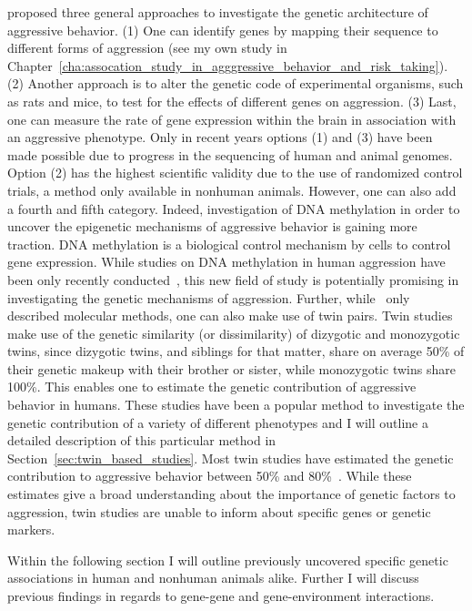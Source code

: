 \citet{Maxson2005} proposed three general approaches to investigate the genetic architecture of aggressive behavior.
(1) One can identify genes by mapping their sequence to different forms of aggression (see my own study in Chapter~\ref{cha:assocation_study_in_agggressive_behavior_and_risk_taking}).
(2) Another approach is to alter the genetic code of experimental organisms, such as rats and mice, to test for the effects of different genes on aggression.
(3) Last, one can measure the rate of gene expression within the brain in association with an aggressive phenotype.
Only in recent years options (1) and (3) have been made possible due to progress in the sequencing of human and animal genomes.
Option (2) has the highest scientific validity due to the use of randomized control trials, a method only available in nonhuman animals.
However, one can also add a fourth and fifth category.
Indeed, investigation of DNA methylation in order to uncover the epigenetic mechanisms of aggressive behavior is gaining more traction.
DNA methylation is a biological control mechanism by cells to control gene expression.
While studies on DNA methylation in human aggression have been only recently  conducted~\cite{VanDongen2015a}, this new field of study is potentially promising in investigating the genetic mechanisms of aggression.
Further, while~\citet{Maxson2005} only described molecular methods, one can also make use of twin pairs.
Twin studies make use of the genetic similarity (or dissimilarity) of dizygotic and monozygotic twins, since dizygotic twins, and siblings for that matter, share on average 50\% of their genetic makeup with their brother or sister, while monozygotic twins share 100\%.
This enables one to estimate the genetic contribution of aggressive behavior in humans.
These studies have been a popular method to investigate the genetic contribution of a variety of different phenotypes and I will outline a detailed description of this particular method in Section~\ref{sec:twin_based_studies}. 
Most twin studies have estimated the genetic contribution to aggressive behavior between 50\% and 80\%~\cite{Porsch2016}.
While these estimates give a broad understanding about the importance of genetic factors  to aggression, twin studies are unable to inform about specific genes or genetic markers.

Within the following section I will outline previously uncovered specific genetic associations in human and nonhuman animals alike.
Further I will discuss previous findings in regards to gene-gene and gene-environment interactions.






